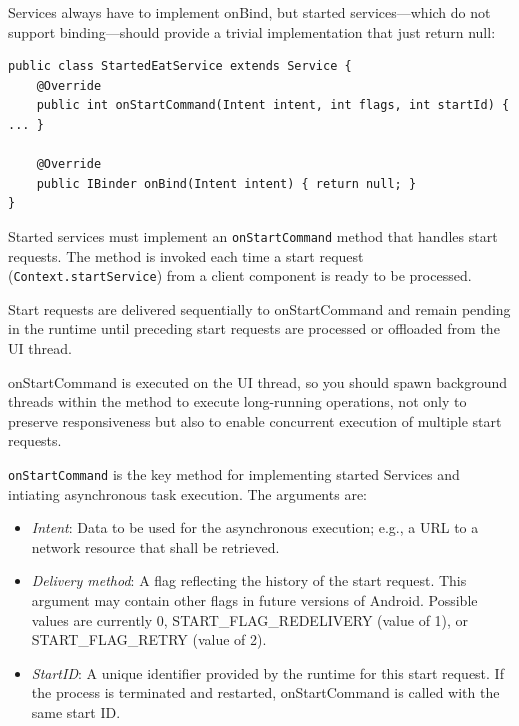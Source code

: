 Services always have to implement onBind, but started services—which do not support
binding—should provide a trivial implementation that just return null:

\begin{lstlisting}
public class StartedEatService extends Service {
    @Override
    public int onStartCommand(Intent intent, int flags, int startId) { ... }

    @Override
    public IBinder onBind(Intent intent) { return null; }
}
\end{lstlisting}

Started services must implement an \texttt{onStartCommand} method that handles start
requests. The method is invoked each time a start request (\texttt{Context.startService})
from a client component is ready to be processed. 

Start requests are delivered sequentially to onStartCommand and remain pending in 
the runtime until preceding start requests are processed or offloaded from the UI thread.

\begin{tcolorbox}[colback=red!5,colframe=red!75!black, title=Problems of onStartCommand]
onStartCommand is executed on the UI thread, so you should spawn background threads
within the method to execute long-running operations, not only to preserve responsiveness 
but also to enable concurrent execution of multiple start requests.

\end{tcolorbox}

\texttt{onStartCommand} is the key method for implementing started Services and intiating
asynchronous task execution. The arguments are: 

\begin{itemize}
    \item \textit{Intent}: Data to be used for the asynchronous execution; e.g., a URL to a network resource
    that shall be retrieved. 
    \item \textit{Delivery method}: A flag reflecting the history of the start request. 
    This argument may contain other flags in future versions of Android. 
    Possible values are currently 0, START\_FLAG\_REDELIVERY (value of 1), or 
    START\_FLAG\_RETRY (value of 2). 
    \item \textit{StartID}: A unique identifier provided by the runtime for this start request. If the process is
terminated and restarted, onStartCommand is called with the same start ID.
\end{itemize}

